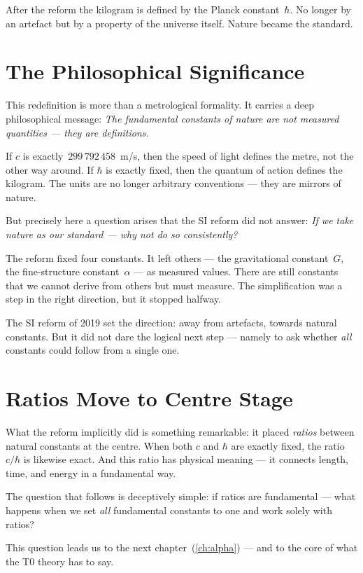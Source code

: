 After the reform the kilogram is defined by the Planck constant~$\hbar$. No longer by an artefact but by a property of the universe itself. Nature became the standard.

\section{The Philosophical Significance}

This redefinition is more than a metrological formality. It carries a deep philosophical message: \emph{The fundamental constants of nature are not measured quantities --- they are definitions.}

If $c$ is exactly~$299\,792\,458$~m/s, then the speed of light defines the metre, not the other way around. If $\hbar$ is exactly fixed, then the quantum of action defines the kilogram. The units are no longer arbitrary conventions --- they are mirrors of nature.

But precisely here a question arises that the SI reform did not answer: \emph{If we take nature as our standard --- why not do so consistently?}

The reform fixed four constants. It left others --- the gravitational constant~$G$, the fine-structure constant~$\alpha$ --- as measured values. There are still constants that we cannot derive from others but must measure. The simplification was a step in the right direction, but it stopped halfway.

\begin{kerngedanke}
The SI reform of 2019 set the direction: away from artefacts, towards natural constants. But it did not dare the logical next step --- namely to ask whether \emph{all} constants could follow from a single one.
\end{kerngedanke}

\section{Ratios Move to Centre Stage}

What the reform implicitly did is something remarkable: it placed \emph{ratios} between natural constants at the centre. When both $c$ and $\hbar$ are exactly fixed, the ratio $c/\hbar$ is likewise exact. And this ratio has physical meaning --- it connects length, time, and energy in a fundamental way.

The question that follows is deceptively simple: if ratios are fundamental --- what happens when we set \emph{all} fundamental constants to one and work solely with ratios?

This question leads us to the next chapter~(\ref{ch:alpha}) --- and to the core of what the T0 theory has to say.
